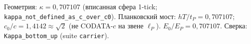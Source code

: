 Геометрия: $\kappa=0{,}707107$ (вписанная сфера 1-tick;
\texttt{kappa\_not\_defined\_as\_c\_over\_c0}).
Планковский мост: $hT/t_P=0{,}707107$; $c_0/c=1{,}4142\approx\sqrt{2}$
(не CODATA-$c$ на звене $\ell_P$). $E_0/E_P=0{,}707107$.
Сверка: \texttt{Kappa\_bottom\_up} (suite \texttt{carrier}).
